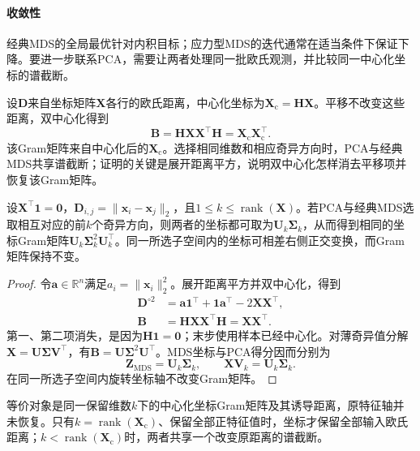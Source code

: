 \paragraph{收敛性}

经典MDS的全局最优针对内积目标；应力型MDS的迭代通常在适当条件下保证下降。要进一步联系PCA，需要让两者处理同一批欧氏观测，并比较同一中心化坐标的谱截断。

设$\bm{D}$来自坐标矩阵$\bm{X}$各行的欧氏距离，中心化坐标为$\bm{X}_{\mathrm{c}}=\bm{H}\bm{X}$。平移不改变这些距离，双中心化得到
\[
  \bm{B}=\bm{H}\bm{X}\bm{X}^{\top}\bm{H}
  =\bm{X}_{\mathrm{c}}\bm{X}_{\mathrm{c}}^{\top}.
\]
该Gram矩阵来自中心化后的$\bm{X}_{\mathrm{c}}$。选择相同维数和相应奇异方向时，PCA与经典MDS共享谱截断；证明的关键是展开距离平方，说明双中心化怎样消去平移项并恢复该Gram矩阵。

\begin{theorem}[欧氏距离下经典MDS与PCA的关系]
  \label{thm:dim-mds-pca}
  设$\bm{X}^{\top}\bm{1}=\bm{0}$，$\bm{D}_{i,j}=\lVert\bm{x}_i-\bm{x}_j\rVert_2$，且$1\leq k\leq\operatorname{rank}(\bm{X})$。若PCA与经典MDS选取相互对应的前$k$个奇异方向，则两者的坐标都可取为$\bm{U}_k\bm{\Sigma}_k$，从而得到相同的坐标Gram矩阵$\bm{U}_k\bm{\Sigma}_k^2\bm{U}_k^{\top}$。同一所选子空间内的坐标可相差右侧正交变换，而Gram矩阵保持不变。
\end{theorem}
\begin{proof}
  令$\bm{a}\in\mathbb{R}^n$满足$a_i=\lVert\bm{x}_i\rVert_2^2$。展开距离平方并双中心化，得到
  \[
    \begin{aligned}
      \bm{D}^{\circ2}
        &=\bm{a}\bm{1}^{\top}+\bm{1}\bm{a}^{\top}
          -2\bm{X}\bm{X}^{\top},\\
      \bm{B}
        &=\bm{H}\bm{X}\bm{X}^{\top}\bm{H}
         =\bm{X}\bm{X}^{\top}.
    \end{aligned}
  \]
  第一、第二项消失，是因为$\bm{H}\bm{1}=\bm{0}$；末步使用样本已经中心化。对薄奇异值分解$\bm{X}=\bm{U}\bm{\Sigma}\bm{V}^{\top}$，有$\bm{B}=\bm{U}\bm{\Sigma}^2\bm{U}^{\top}$。MDS坐标与PCA得分因而分别为
  \[
    \bm{Z}_{\mathrm{MDS}}=\bm{U}_k\bm{\Sigma}_k,
    \qquad
    \bm{X}\bm{V}_k=\bm{U}_k\bm{\Sigma}_k.
  \]
  在同一所选子空间内旋转坐标轴不改变Gram矩阵。
\end{proof}

等价对象是同一保留维数$k$下的中心化坐标Gram矩阵及其诱导距离，原特征轴并未恢复。只有$k=\operatorname{rank}(\bm{X}_{\mathrm{c}})$、保留全部正特征值时，坐标才保留全部输入欧氏距离；$k<\operatorname{rank}(\bm{X}_{\mathrm{c}})$时，两者共享一个改变原距离的谱截断。

